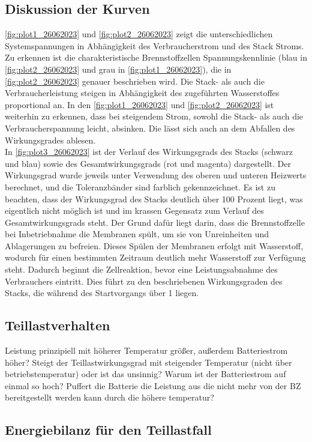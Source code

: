    \subsection{Diskussion der Kurven}
   \autoref{fig:plot1_26062023} und \autoref{fig:plot2_26062023} zeigt die unterschiedlichen Systemspannungen in Abhängigkeit des
Verbraucherstrom und des Stack Stroms. Zu erkennen ist die charakteristische Brennstoffzellen Spannungskennlinie
 (blau in \autoref{fig:plot2_26062023} und grau in  \autoref{fig:plot1_26062023}), die in \autoref{fig:plot2_26062023} genauer beschrieben wird. Die Stack- als auch die Verbraucherleistung
steigen in Abhängigkeit des zugeführten Wasserstoffes proportional an. In den \autoref{fig:plot1_26062023} 
und \autoref{fig:plot2_26062023} ist weiterhin zu erkennen, dass bei
 steigendem Strom, sowohl die Stack- als
auch die Verbraucherspannung leicht, absinken. Die lässt sich auch an dem Abfallen des
Wirkungsgrades ablesen.
\\ In \autoref{fig:plot3_26062023} ist der Verlauf des Wirkungsgrads des Stacks (schwarz und blau) sowie des Gesamtwirkungsgrads (rot und magenta) dargestellt. Der Wirkungsgrad wurde jeweils unter Verwendung des oberen und unteren Heizwerts berechnet, und die Toleranzbänder sind farblich gekennzeichnet. Es ist zu beachten, dass der Wirkungsgrad des Stacks deutlich über 100 Prozent liegt, was eigentlich nicht möglich ist und im krassen Gegensatz zum Verlauf des Gesamtwirkungsgrads steht.
Der Grund dafür liegt darin, dass die Brennstoffzelle bei Inbetriebnahme die Membranen spült, um sie von Unreinheiten und Ablagerungen zu befreien. Dieses Spülen der Membranen erfolgt mit Wasserstoff, wodurch für einen bestimmten Zeitraum deutlich mehr Wasserstoff zur Verfügung steht. Dadurch beginnt die Zellreaktion, bevor eine Leistungsabnahme des Verbrauchers eintritt. Dies führt zu den beschriebenen Wirkungsgraden des Stacks, die während des Startvorgangs über 1 liegen.
\\
\subsection{}
\subsection{Teillastverhalten}

Leistung prinzipiell mit höherer Temperatur größer, außerdem Batteriestrom höher? 
Steigt der Teillastwirkungsgrad mit steigender Temperatur (nicht über betriebstemperatur) oder ist das unsinnig?
Warum ist der Batteriestrom auf einmal so hoch? Puffert die Batterie die Leistung aus die nicht mehr von der BZ bereitgestellt werden kann durch die höhere temperatur?



\subsection{Energiebilanz für den Teillastfall}